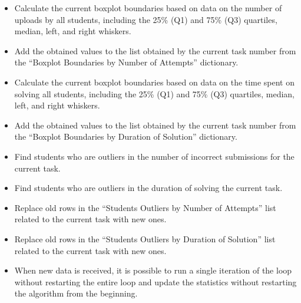 \documentclass[letterpaper]{article}
\begin{document}
\begin{multicols}{2}
\begin{justify}
\begin{enumerate}
\begin{enumerate}[leftmargin=-2pt, itemindent=37pt]
\begin{itemize}[leftmargin=30pt, itemindent=0pt]
            \item Calculate the current boxplot boundaries based on data on the number of uploads by all students, including the 25\% (Q1) and 75\% (Q3) quartiles, median, left, and right whiskers.
            \item Add the obtained values to the list obtained by the current task number from the “Boxplot Boundaries by Number of Attempts” dictionary.
            \item Calculate the current boxplot boundaries based on data on the time spent on solving all students, including the 25\% (Q1) and 75\% (Q3) quartiles, median, left, and right whiskers.
            \item Add the obtained values to the list obtained by the current task number from the “Boxplot Boundaries by Duration of Solution” dictionary.
            \item Find students who are outliers in the number of incorrect submissions for the current task.
            \item Find students who are outliers in the duration of solving the current task.
            \item Replace old rows in the “Students Outliers by Number of Attempts” list related to the current task with new ones.
            \item Replace old rows in the “Students Outliers by Duration of Solution” list related to the current task with new ones.
            \item When new data is received, it is possible to run a single iteration of the loop without restarting the entire loop and update the statistics without restarting the algorithm from the beginning.
          \end{itemize}
        \end{enumerate}
      \end{enumerate}
    \end{justify}
  \end{multicols}
\end{document}
